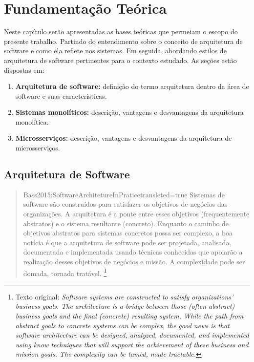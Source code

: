 \chapter{Fundamentação Teórica}

Neste capítulo serão apresentadas as bases teóricas que permeiam o escopo do presente trabalho.
Partindo do entendimento sobre o conceito de arquitetura de software e como ela reflete nos
sistemas. Em seguida, abordando estilos de arquitetura de software pertinentes para o contexto
estudado. As seções estão dispostas em:

  \begin{enumerate}
    \item \textbf{Arquitetura de software:} definição do termo arquitetura dentro da área de
        software e suas características.
    \item \textbf{Sistemas monolíticos:} descrição, vantagens e desvantagens da arquitetura monolítica.
    \item \textbf{Microsserviços:} descrição, vantagens e desvantagens da arquitetura de
        microsserviços.
  \end{enumerate}

\section{Arquitetura de Software}

\begin{quotation}{Bass2015:SoftwareArchitetureInPratice}{transleted=true}
    Sistemas de software são construídos para satisfazer os objetivos de negócios das organizações. A
    arquitetura é a ponte entre esses objetivos (frequentemente abstratos) e o sistema resultante
    (concreto). Enquanto o caminho de objetivos abstratos para sistemas concretos possa
    ser complexo, a boa notícia é que a arquitetura de software pode ser projetada, analisada,
    documentada e implementada usando técnicas conhecidas que apoiarão a realização desses objetivos
    de negócios e missão. A complexidade pode ser domada, tornada tratável.
    \footnote{Texto original: \textit{Software systems are constructed to satisfy organizations' business goals. The
    architecture is a bridge between those (often abstract) business goals and the final (concrete)
    resulting system. While the path from abstract goals to concrete systems can be complex, the
    good news is that software architecture can be designed, analyzed, documented, and implemented
    using know techniques that will support the achievement of these business and mission goals. The
    complexity can be tamed, made tractable.}}
\end{quotation}

